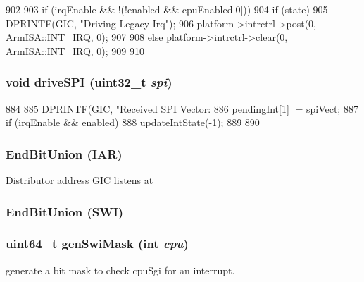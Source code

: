 \begin{DoxyCode}
902 {
903     if (irqEnable && !(!enabled && cpuEnabled[0])) {
904         if (state) {
905             DPRINTF(GIC, "Driving Legacy Irq\n");
906             platform->intrctrl->post(0, ArmISA::INT_IRQ, 0);
907         }
908         else platform->intrctrl->clear(0, ArmISA::INT_IRQ, 0);
909     }
910 }
\end{DoxyCode}
\hypertarget{classPl390_a20535305eb1231d731f6f34a69e96d78}{
\subsubsection[{driveSPI}]{\setlength{\rightskip}{0pt plus 5cm}void driveSPI ({\bf uint32\_\-t} {\em spi})}}
\label{classPl390_a20535305eb1231d731f6f34a69e96d78}



\begin{DoxyCode}
884 {
885     DPRINTF(GIC, "Received SPI Vector:%
886     pendingInt[1] |= spiVect;
887     if (irqEnable && enabled) {
888         updateIntState(-1);
889     }
890 }
\end{DoxyCode}
\hypertarget{classPl390_af3e922c98e5df31ce49f179286cf9d48}{
\subsubsection[{EndBitUnion}]{\setlength{\rightskip}{0pt plus 5cm}EndBitUnion (IAR)}}
\label{classPl390_af3e922c98e5df31ce49f179286cf9d48}
Distributor address GIC listens at \hypertarget{classPl390_a094c748f681520d1c676cc22f9542515}{
\subsubsection[{EndBitUnion}]{\setlength{\rightskip}{0pt plus 5cm}EndBitUnion (SWI)}}
\label{classPl390_a094c748f681520d1c676cc22f9542515}
\hypertarget{classPl390_a049810caa3741b4b2735ef8b793d4715}{
\subsubsection[{genSwiMask}]{\setlength{\rightskip}{0pt plus 5cm}uint64\_\-t genSwiMask (int {\em cpu})}}
\label{classPl390_a049810caa3741b4b2735ef8b793d4715}
generate a bit mask to check cpuSgi for an interrupt. 


